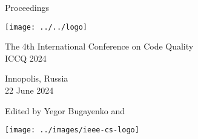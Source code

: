 \thispagestyle{empty}
\begin{center}
Proceedings

\vspace{1in}

\texttt{[image: ../../logo]}

\vspace{0.5in}

{\Large The 4th International Conference on Code Quality\\[12pt]
ICCQ 2024}

\vspace{0.5in}

Innopolis, Russia\\
22 June 2024

\vspace{0.5in}

Edited by Yegor Bugayenko and 

\vspace{1.5in}




\texttt{[image: ../images/ieee-cs-logo]}

\end{center}

